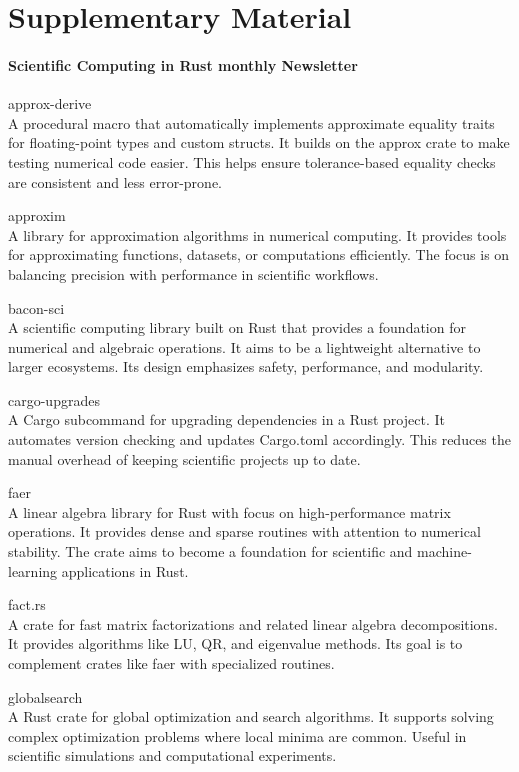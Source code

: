 \documentclass{article}
\begin{document}
\section{Supplementary Material}

\paragraph{Scientific Computing in Rust monthly Newsletter}

approx-derive\\
A procedural macro that automatically implements approximate equality traits for
floating-point types and custom structs. It builds on the approx crate to make testing numerical
code easier. This helps ensure tolerance-based equality checks are consistent and less error-prone.

approxim\\
A library for approximation algorithms in numerical computing. It provides tools for
approximating functions, datasets, or computations efficiently. The focus is on balancing precision
with performance in scientific workflows.

bacon-sci\\
A scientific computing library built on Rust that provides a foundation for numerical
and algebraic operations. It aims to be a lightweight alternative to larger ecosystems. Its design
emphasizes safety, performance, and modularity.

cargo-upgrades\\
A Cargo subcommand for upgrading dependencies in a Rust project. It automates
version checking and updates Cargo.toml accordingly. This reduces the manual overhead of keeping
scientific projects up to date.

faer\\
A linear algebra library for Rust with focus on high-performance matrix operations. It
provides dense and sparse routines with attention to numerical stability. The crate aims to become
a foundation for scientific and machine-learning applications in Rust.

fact.rs\\
A crate for fast matrix factorizations and related linear algebra decompositions. It
provides algorithms like LU, QR, and eigenvalue methods. Its goal is to complement crates like faer
with specialized routines.

globalsearch\\
A Rust crate for global optimization and search algorithms. It supports solving
complex optimization problems where local minima are common. Useful in scientific simulations and
computational experiments.
\end{document}

